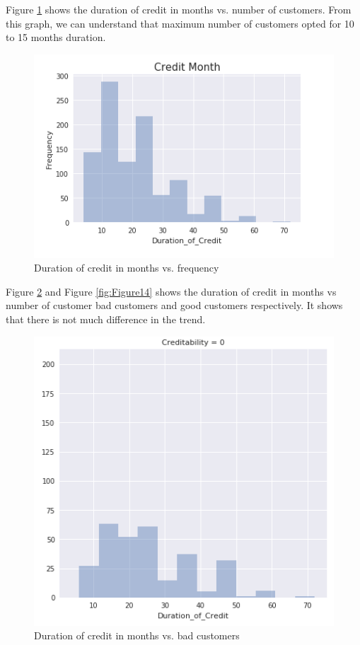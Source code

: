 \documentclass[sigconf]{acmart}
\begin{document}
Figure \ref{fig:Figure12} shows the duration of credit in months vs. number of customers. From this graph, we can understand that maximum number of customers opted for 10 to 15 months duration.

\begin{figure}[htb]
  \centering
  \includegraphics[width=1.0\columnwidth]{images/Figure12.png}
  \caption{Duration of credit in months vs. frequency}
  \label{fig:Figure12}
\end{figure}

Figure \ref{fig:Figure13} and Figure \ref{fig:Figure14} shows the duration of credit in months vs number of customer bad customers and good customers respectively. It shows that there is not much difference in the trend.

\begin{figure}[htb]
  \centering
  \includegraphics[width=1.0\columnwidth]{images/Figure13.png}
  \caption{Duration of credit in months vs. bad customers}
  \label{fig:Figure13} 
\end{figure}
\end{document}
